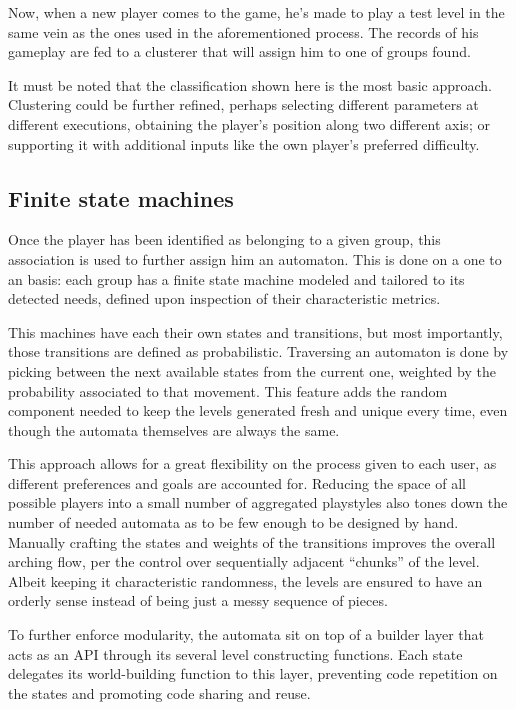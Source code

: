 \documentclass[conference]{IEEEtran}
\begin{document}
Now, when a new player comes to the game, he's made to play a test level in the same vein as the ones used in the aforementioned process. The records of his gameplay are fed to a clusterer that will assign him to one of groups found.

It must be noted that the classification shown here is the most basic approach. Clustering could be further refined, perhaps selecting different parameters at different executions, obtaining the player's position along two different axis; or supporting it with additional inputs like the own player's preferred difficulty.

\subsection{Finite state machines}

Once the player has been identified as belonging to a given group, this association is used to further assign him an automaton. This is done on a one to an basis: each group has a finite state machine modeled and tailored to its detected needs, defined upon inspection of their characteristic metrics.

This machines have each their own states and transitions, but most importantly, those transitions are defined as probabilistic. Traversing an automaton is done by picking between the next available states from the current one, weighted by the probability associated to that movement. This feature adds the random component needed to keep the levels generated fresh and unique every time, even though the automata themselves are always the same.

This approach allows for a great flexibility on the process given to each user, as different preferences and goals are accounted for. Reducing the space of all possible players into a small number of aggregated playstyles also tones down the number of needed automata as to be few enough to be designed by hand. Manually crafting the states and weights of the transitions improves the overall arching flow, per the control over sequentially adjacent ``chunks'' of the level. Albeit keeping it characteristic randomness, the levels are ensured to have an orderly sense instead of being just a messy sequence of pieces.

To further enforce modularity, the automata sit on top of a builder layer that acts as an API through its several level constructing functions. Each state delegates its world-building function to this layer, preventing code repetition on the states and promoting code sharing and reuse. 
\end{document}
